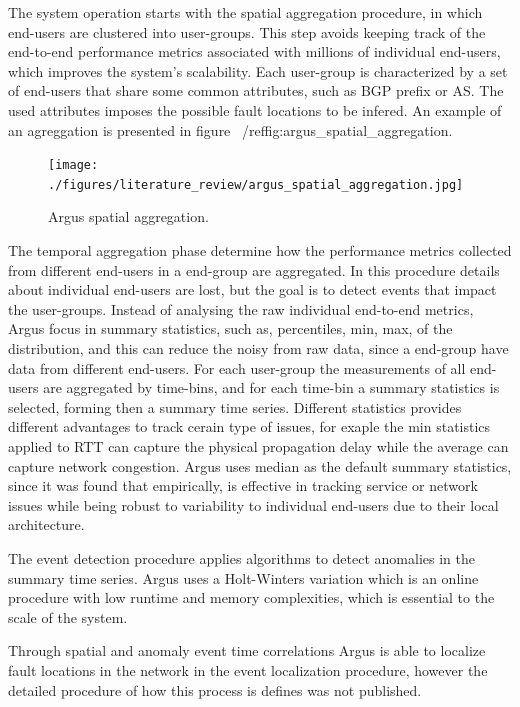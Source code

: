 The system operation starts with the spatial aggregation procedure, in which
end-users are clustered into user-groups. This step avoids keeping
track of the end-to-end performance metrics associated with millions of
individual end-users, which improves the system's scalability.
Each user-group is characterized by a set of end-users that share some common
attributes, such as BGP prefix or AS. The used attributes imposes the possible
fault locations to be infered.
An example of an agreggation is presented in figure
~/ref{fig:argus_spatial_aggregation}.

\begin{figure}[H]
    \centering
    \texttt{[image: ./figures/literature\_review/argus\_spatial\_aggregation.jpg]}
    \caption{Argus spatial aggregation.}
    \label{fig:argus_spatial_aggregation}
\end{figure}%

The temporal aggregation phase determine how the performance metrics collected
from different end-users in a end-group are aggregated. In this procedure
details about individual end-users are lost, but the goal is to detect events
that impact the user-groups. Instead of analysing the raw individual end-to-end
metrics, Argus focus in summary statistics, such as, percentiles, min, max, of
the distribution, and this can reduce the noisy from raw data, since a
end-group have data from different end-users. For each user-group the
measurements of all end-users are aggregated by time-bins, and for each
time-bin a summary statistics is selected, forming then a summary time series.
Different statistics provides different advantages to track cerain type of
issues, for exaple the min statistics applied to RTT can capture the physical
propagation delay while the average can capture network congestion. Argus uses
median as the default summary statistics, since it was found that empirically,
is effective in tracking service or network issues while being robust to
variability to individual end-users due to their local architecture.

The event detection procedure applies algorithms to detect anomalies in the
summary time series. Argus uses a Holt-Winters variation which is an online
procedure with low runtime and memory complexities, which is essential to the
scale of the system.

Through spatial and anomaly event time correlations Argus is able to localize
fault locations in the network in the event localization procedure, however the
detailed procedure of how this
process is defines was not published.

